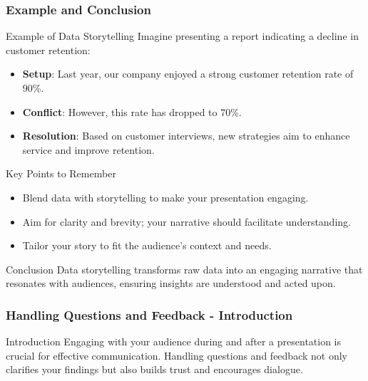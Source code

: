 \documentclass{beamer}
\begin{document}
\begin{frame}[fragile]
    \frametitle{Example and Conclusion}
    \begin{block}{Example of Data Storytelling}
        Imagine presenting a report indicating a decline in customer retention:
        \begin{itemize}
            \item \textbf{Setup}: Last year, our company enjoyed a strong customer retention rate of 90\%.
            \item \textbf{Conflict}: However, this rate has dropped to 70\%.
            \item \textbf{Resolution}: Based on customer interviews, new strategies aim to enhance service and improve retention.
        \end{itemize}
    \end{block}
    
    \begin{block}{Key Points to Remember}
        \begin{itemize}
            \item Blend data with storytelling to make your presentation engaging.
            \item Aim for clarity and brevity; your narrative should facilitate understanding.
            \item Tailor your story to fit the audience's context and needs.
        \end{itemize}
    \end{block}
    
    \begin{block}{Conclusion}
        Data storytelling transforms raw data into an engaging narrative that resonates with audiences, ensuring insights are understood and acted upon.
    \end{block}
\end{frame}

\begin{frame}[fragile]
    \frametitle{Handling Questions and Feedback - Introduction}
    \begin{block}{Introduction}
        Engaging with your audience during and after a presentation is crucial for effective communication. 
        Handling questions and feedback not only clarifies your findings but also builds trust and encourages dialogue.
    \end{block}
\end{frame}
\end{document}
